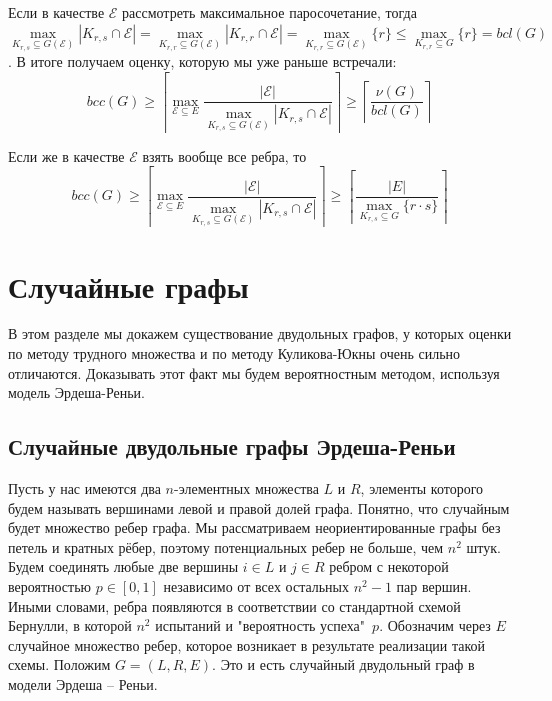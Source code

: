 \documentclass[a4paper]{article}
\begin{document}
Если в качестве $\mathcal{E}$ рассмотреть максимальное паросочетание, тогда $\max\limits_{K_{r,s}\subseteq 
G(\mathcal{E})}|K_{r,s}\cap\mathcal{E}| = \max\limits_{K_{r,r}\subseteq G(\mathcal{E})}|K_{r,r}\cap\mathcal{E}| = 
\max\limits_{K_{r,r}\subseteq G(\mathcal{E})}\{r\} \leq \max\limits_{K_{r,r}\subseteq G}\{r\} = bcl(G)$. В итоге 
получаем оценку, которую мы уже раньше встречали: $$bcc(G) \geq \left\lceil\max\limits_{\mathcal{E}\subseteq E}\frac{|\mathcal{E}|}
{\max\limits_{K_{r,s}\subseteq G(\mathcal{E})}|K_{r,s}\cap\mathcal{E}|}\right\rceil  \geq \left\lceil\frac{\nu(G)}{bcl(G)}\right\rceil$$

Если же в качестве $\mathcal{E}$ взять вообще все ребра, то $$bcc(G) \geq \left\lceil\max\limits_{\mathcal{E}\subseteq E}\frac{|\mathcal{E}|}
{\max\limits_{K_{r,s}\subseteq G(\mathcal{E})}|K_{r,s}\cap\mathcal{E}|}\right\rceil \geq \left\lceil\frac{|E|}
{\max\limits_{K_{r,s}\subseteq G}\{r\cdot s\}}\right\rceil$$

\setcounter{mclaim}{0}
\setcounter{mlemma}{0}
\setcounter{mtheorem}{0}
\addtocounter{section}{1}
\section*{Случайные графы}
В этом разделе мы докажем существование двудольных графов, у которых оценки по методу трудного множества и 
по методу Куликова-Юкны очень сильно отличаются. Доказывать этот факт мы будем вероятностным методом, 
используя модель Эрдеша-Реньи.

\setcounter{subsection}{0}
\subsection{Случайные двудольные графы Эрдеша-Реньи}

Пусть у нас имеются два $n$-элементных множества $L$ и $R$, элементы которого будем называть вершинами 
левой и правой долей графа. Понятно, что случайным будет множество ребер графа. Мы рассматриваем 
неориентированные графы без петель и кратных рёбер, поэтому потенциальных ребер не больше, чем $n^2$ штук. 
Будем соединять любые две вершины $i \in L$ и $j \in R$ ребром с некоторой вероятностью $p\in [0, 1]$ 
независимо от всех остальных $n^2 - 1$ пар вершин. Иными словами, ребра появляются в соответствии со 
стандартной схемой Бернулли, в которой $n^2$ испытаний и "вероятность успеха"\ $p$. Обозначим через $E$
случайное множество ребер, которое возникает в результате реализации такой схемы. Положим $G = (L, R, E)$. 
Это и есть случайный двудольный граф в модели Эрдеша – Реньи. 
\end{document}
